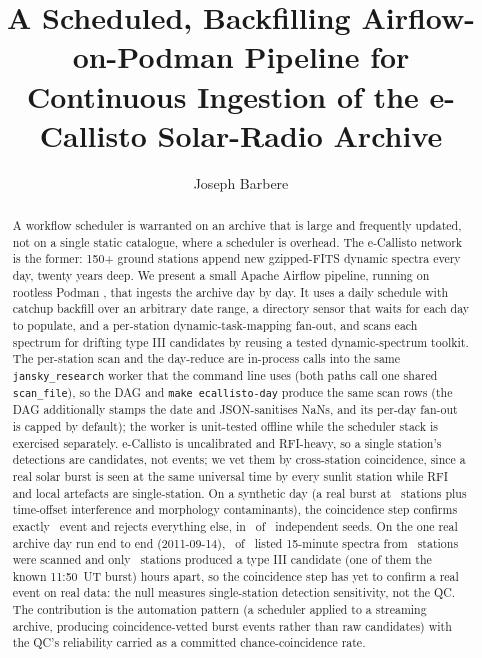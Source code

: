 \documentclass[twocolumn]{aastex631}
\newcommand{\code}[1]{\texttt{#1}}
\begin{document}
\title{A Scheduled, Backfilling Airflow-on-Podman Pipeline for Continuous Ingestion of the e-Callisto
Solar-Radio Archive}

\author[0009-0008-3289-4447]{Joseph Barbere}

\begin{abstract}
A workflow scheduler is warranted on an archive that is large and frequently updated, not on a
single static catalogue, where a scheduler is overhead. The e-Callisto network \citep{benz2009} is the former: 150+ ground
stations append new gzipped-FITS dynamic spectra every day, twenty years deep. We present a small
Apache Airflow \citep{airflow} pipeline, running on rootless Podman \citep{podman}, that ingests
the archive day by day. It uses a daily schedule with catchup backfill over an arbitrary date
range, a directory sensor that waits for each day to populate, and a per-station
dynamic-task-mapping fan-out, and scans each spectrum for drifting type III candidates by reusing
a tested dynamic-spectrum toolkit. The per-station scan and the day-reduce are in-process calls
into the same \code{jansky\_research} worker that the command line uses (both paths call one shared \code{scan\_file}), so the DAG and \code{make ecallisto-day} produce the same scan
rows (the DAG additionally stamps the date and JSON-sanitises NaNs, and its per-day fan-out is
capped by default); the worker is unit-tested offline while the scheduler stack is exercised
separately. e-Callisto is uncalibrated and RFI-heavy, so a single
station's detections are candidates, not events; we vet them by cross-station coincidence, since a
real solar burst is seen at the same universal time by every sunlit station while RFI and local
artefacts are single-station. On a synthetic day (a real burst at \ecSynMaxEventStations\ stations
plus time-offset interference and morphology contaminants), the coincidence step confirms exactly
\ecSynNevents\ event and rejects everything else, in \ecSynEnsOk\ of \ecSynEnsN\ independent
seeds. On the one real archive day run end to end (2011-09-14), \ecRealNscanned\ of
\ecRealNfilesListed\ listed 15-minute spectra from \ecRealNstationsScanned\ stations were
scanned and only \ecRealNcandStations\ stations produced a type III candidate (one of them the known 11:50~UT burst) hours apart, so the coincidence step has yet to confirm a real
event on real data: the null measures single-station detection sensitivity, not the QC. The contribution is the automation pattern (a scheduler applied to a streaming archive, producing coincidence-vetted burst events rather than raw candidates) with the QC's reliability
carried as a committed chance-coincidence rate.
\end{abstract}
\end{document}

